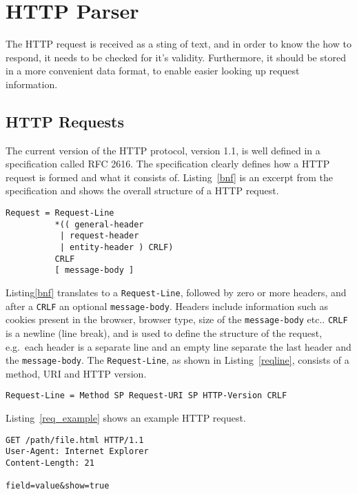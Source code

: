 \section{HTTP Parser}

The HTTP request is received as a sting of text, and in order to know the how
to respond, it needs to be checked for it's validity. Furthermore, it should
be stored in a more convenient data format, to enable easier looking up
request information.

\subsection{HTTP Requests}
The current version of the HTTP protocol, version 1.1, is well defined in a
specification called RFC 2616\cite{rfc}. The specification clearly defines how
a HTTP request is formed and what it consists of. Listing~\ref{bnf} is an
excerpt from the specification and shows the overall structure of a HTTP
request.

\bigskip
\begin{lstlisting}[label=bnf,caption=HTTP request structure]
Request = Request-Line
          *(( general-header
           | request-header
           | entity-header ) CRLF)
          CRLF
          [ message-body ]
\end{lstlisting}

Listing\ref{bnf} translates to a \texttt{Request-Line}, followed by zero or
more headers, and after a \texttt{CRLF} an optional \texttt{message-body}.
Headers include information such as cookies present in the browser, browser
type, size of the \texttt{message-body} etc.. \texttt{CRLF} is a newline (line
break), and is used to define the structure of the request, e.g.\ each
header is a separate line and an empty line separate the last header and the
\texttt{message-body}. The \texttt{Request-Line}, as shown in
Listing~\ref{reqline}, consists of a method, URI and HTTP version.

\bigskip
\begin{lstlisting}[label=reqline,caption=HTTP Request-Line]
Request-Line = Method SP Request-URI SP HTTP-Version CRLF
\end{lstlisting}

Listing~\ref{req_example} shows an example HTTP request.

\bigskip
\begin{lstlisting}[label=req_example,caption=Example HTTP request]
GET /path/file.html HTTP/1.1
User-Agent: Internet Explorer
Content-Length: 21

field=value&show=true
\end{lstlisting}

